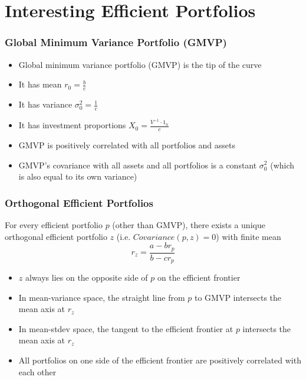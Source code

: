 \documentclass{beamer}
\begin{document}
\section{Interesting Efficient Portfolios}
\begin{frame}
\frametitle{Global Minimum Variance Portfolio (GMVP)}
\begin{itemize}
\item Global minimum variance portfolio (GMVP) is the tip of the curve
\item It has mean $r_0 = \frac b c$
\item It has variance $\sigma_0^2 = \frac 1 c$
\item It has investment proportions $X_0 = \frac {V^{-1} \cdot 1_n} c$
\item GMVP is positively correlated with all portfolios and assets
\item GMVP's covariance with all assets and all portfolios is a constant $\sigma_0^2$ (which is also equal to its own variance)
\end{itemize}
\end{frame}

\begin{frame}
\frametitle{Orthogonal Efficient Portfolios}
For every efficient portfolio $p$ (other than GMVP), there exists a unique orthogonal efficient portfolio $z$ (i.e. $Covariance(p,z) = 0$) with finite mean
$$r_z = \frac {a - b r_p} {b - c r_p}$$
\begin{itemize}
\item $z$ always lies on the opposite side of $p$ on the efficient frontier
\item  In mean-variance space, the straight line from $p$ to GMVP intersects the mean axis at  $r_z$
\item In mean-stdev space, the tangent to the efficient frontier at $p$ intersects the mean axis at $r_z$
\item All portfolios on one side of the efficient frontier are positively correlated with each other
\end{itemize}
\end{frame}
\end{document}
